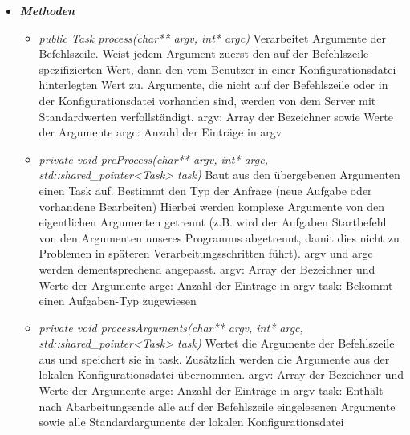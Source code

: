 \documentclass[a4paper,12pt]{article}
\begin{document}
\begin{itemize}[label={}]

	\item \textit{\textbf{Methoden}}
		\begin{itemize}[label={\textbullet}]
			\item \textit{public Task process(char** argv, int* argc)} Verarbeitet Argumente der Befehlszeile. Weist jedem Argument zuerst den auf der Befehlszeile spezifizierten Wert, dann den vom Benutzer in einer Konfigurationsdatei hinterlegten Wert zu. Argumente, die nicht auf der Befehlszeile oder in der Konfigurationsdatei vorhanden sind, werden von dem Server mit Standardwerten verfollständigt.\newline
			\newline
			argv: Array der Bezeichner sowie Werte der Argumente\newline
			argc: Anzahl der Einträge in argv


			\item \textit{private void preProcess(char** argv, int* argc, std::shared\_pointer<Task> task)}
			Baut aus den übergebenen Argumenten einen Task auf.\newline
			Bestimmt den Typ der Anfrage (neue Aufgabe oder vorhandene Bearbeiten)\newline
			Hierbei werden komplexe Argumente von den eigentlichen Argumenten getrennt (z.B. wird der Aufgaben 	Startbefehl von den Argumenten unseres Programms abgetrennt, damit dies nicht zu Problemen in späteren
			Verarbeitungsschritten führt).\newline
			argv und argc werden dementsprechend angepasst.\newline
			\newline
			argv: Array der Bezeichner und Werte der Argumente\newline
			argc: Anzahl der Einträge in argv\newline
			task: Bekommt einen Aufgaben-Typ zugewiesen


			\item \textit{private void processArguments(char** argv, int* argc, std::shared\_pointer<Task> task)}
			Wertet die Argumente der Befehlszeile aus und speichert sie in task.\newline
			Zusätzlich werden die Argumente aus der lokalen Konfigurationsdatei übernommen.\newline
			\newline
			argv: Array der Bezeichner und Werte der Argumente\newline
			argc: Anzahl der Einträge in argv\newline
			task: Enthält nach Abarbeitungsende alle auf der Befehlszeile eingelesenen Argumente sowie alle Standardargumente der lokalen Konfigurationsdatei


		\end{itemize}


\end{itemize}
\end{document}
